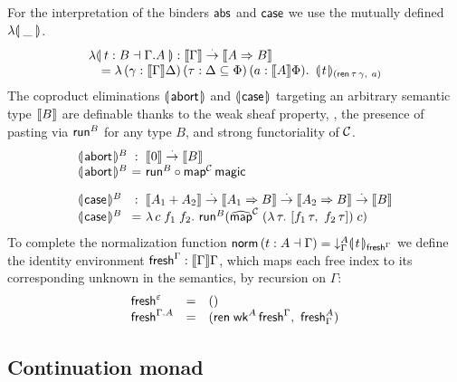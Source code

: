 \documentclass[sigplan,screen,fleqn]{acmart}
\begin{document}
For the interpretation of the binders $\mathsf{abs}$ and $\mathsf{case}$ we use the
mutually defined $\fden{\_}$.
\[
\begin{array}{l}
  \fden{t : B \from \cext \Gamma A}
    : \den \Gamma \todot \den{A \To B} \\
    \quad =
      \lambda\, (\gamma : \den \Gamma \Delta)
      \,(\tau : \Delta \sublist \Phi)
      \,(a : \den A \Phi)
      .\ \,
      \dent t {(\tren\,\tau\,\gamma,\ a)} \\
\end{array}
\]
The coproduct eliminations $\llparenthesis\kern0.3ex\mathsf{abort}\kern0.3ex\rrparenthesis$ and $\llparenthesis\kern0.3ex\mathsf{case}\kern0.3ex\rrparenthesis$
targeting an arbitrary semantic type $\mathopen{{[\kern-0.14em[}} B \mathclose{{]\kern-0.14em]}}$ are definable thanks to
the weak sheaf property, \ie, the presence of pasting via $\mathsf{run}^B$
for any type $B$, and strong functoriality of $\mathcal{C}$.
\[
\begin{array}{l@{~}c@{~}l}
  \denabort^B & : & \den \tyzero \todot \den B \\
  \denabort^B & = & \trun^B \comp \tmap[\C]\,\tmagic
\\[2ex]
  \dencase^B  & : & \den{A_1 + A_2}
    \todot \den{A_1 \To B}
    \todot \den{A_2 \To B}
    \todot \den{B} \\
  \dencase^B & = & \lambda\,c\;f_1\;f_2.\
    \trun^B (\stmap[\C]\;(\lambda\,\tau.\ [f_1\,\tau,\ f_2\,\tau])\;c) \\
\end{array}
\]
To complete the normalization function
$\mathsf{norm}\,(t : A \dashv \Gamma) = \mathord{\downarrow_{\Gamma}^{A}} \llparenthesis\kern0.3ext\kern0.3ex\rrparenthesis_{\mathsf{fresh}^{\Gamma}}$
we define the identity environment $\mathsf{fresh}^{\Gamma} : \mathopen{{[\kern-0.14em[}} \Gamma \mathclose{{]\kern-0.14em]}} \Gamma$,
which maps each free index to its corresponding unknown in the
semantics, by recursion on $\Gamma$:
\[
\begin{array}{lcl}
  \mathsf{fresh}^{\varepsilon} & = & () \\
  \mathsf{fresh}^{\Gamma.A} & = & (\mathsf{ren}\;\mathsf{wk}^A\,\mathsf{fresh}^{\Gamma}, \  \mathsf{fresh}^A_\Gamma)\\
\end{array}
\]

\subsection{Continuation monad}
\end{document}
